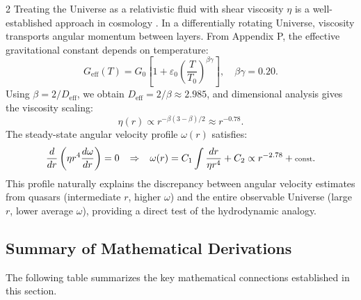 \documentclass[12pt,a4paper]{article}
\begin{document}
\begin{multicols}{2}
		Treating the Universe as a relativistic fluid with shear viscosity \(\eta\) is a well-established approach in cosmology \cite{Giovannini2005}. In a differentially rotating Universe, viscosity transports angular momentum between layers. From Appendix P, the effective gravitational constant depends on temperature:
		\begin{equation}
			G_{\mathrm{eff}}(T) = G_0\left[1 + \varepsilon_0\left(\frac{T}{T_0}\right)^{\beta\gamma}\right], \quad \beta\gamma = 0.20.
		\end{equation}
		Using \(\beta = 2/D_{\mathrm{eff}}\), we obtain \(D_{\mathrm{eff}} = 2/\beta \approx 2.985\), and dimensional analysis gives the viscosity scaling:
		\begin{equation}
			\eta(r) \propto r^{-\beta(3-\beta)/2} \approx r^{-0.78}.
		\end{equation}
		The steady-state angular velocity profile \(\omega(r)\) satisfies:
		\begin{equation}
			\scriptsize
			\frac{d}{dr}\left( \eta r^4 \frac{d\omega}{dr} \right) = 0 \quad \Rightarrow \quad \omega(r) = C_1 \int \frac{dr}{\eta r^4} + C_2 \propto r^{-2.78} + \text{const}.
		\end{equation}
		This profile naturally explains the discrepancy between angular velocity estimates from quasars (intermediate \(r\), higher \(\omega\)) and the entire observable Universe (large \(r\), lower average \(\omega\)), providing a direct test of the hydrodynamic analogy.
		
		\subsection{Summary of Mathematical Derivations}
		
		The following table summarizes the key mathematical connections established in this section.
		
	\end{multicols}
	
\end{document}
